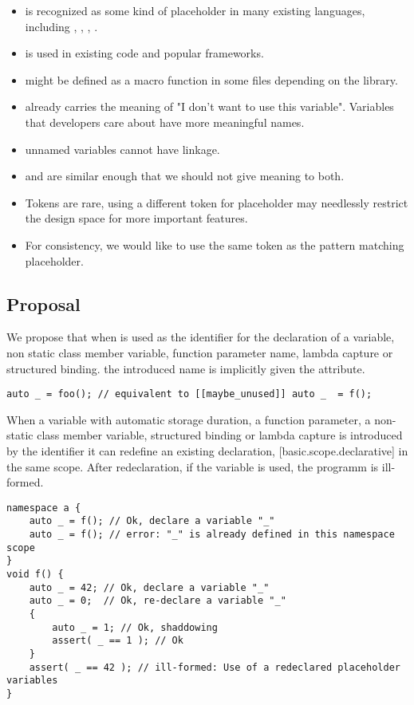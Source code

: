 \documentclass{wg21}
\begin{document}
\begin{itemize}
\item \tcode{_} is recognized as some kind of placeholder in many existing languages, including , , , .
\item \tcode{_} is used in existing code and popular frameworks.
\item \tcode{_} might be defined as a macro function in some files depending on the  library.
\item \tcode{_} already carries the meaning of "I don't want to use this variable". Variables that developers care about have more meaningful names.
\item \tcode{_} unnamed variables cannot have linkage.
\item \tcode{_} and \tcode{__} are similar enough that we should not give meaning to both.
\item Tokens are rare, using a different token for placeholder may needlessly restrict the design space for more important features.
\item For consistency, we would like to use the same token as the pattern matching placeholder.
\end{itemize}

\subsection{Proposal}

We propose that when \tcode{_} is used as the identifier for the declaration of a variable, non static class member variable, function parameter name,
lambda capture or structured binding.
the introduced name is implicitly given the  attribute.

\begin{example}
\begin{lstlisting}[style=color]
auto _ = foo(); // equivalent to [[maybe_unused]] auto _  = f();
\end{lstlisting}
\end{example}

When a variable with automatic storage duration, a function parameter, a non-static class member variable, structured binding or lambda capture is introduced by the identifier \tcode{_}
it can redefine an existing declaration, [basic.scope.declarative] in the same scope. After redeclaration, if the variable is used, the programm is ill-formed.

\begin{example}
\begin{lstlisting}[style=color]
namespace a {
    auto _ = f(); // Ok, declare a variable "_"
    auto _ = f(); // error: "_" is already defined in this namespace scope
}
void f() {
    auto _ = 42; // Ok, declare a variable "_"
    auto _ = 0;  // Ok, re-declare a variable "_"
    {
        auto _ = 1; // Ok, shaddowing
        assert( _ == 1 ); // Ok
    }
    assert( _ == 42 ); // ill-formed: Use of a redeclared placeholder variables
}
\end{lstlisting}
\end{example}
\end{document}
